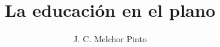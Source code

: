 \documentclass[12pt]{guia}
\title{La educaci\'on en el plano}
\author{J. C. Melchor Pinto}
\begin{document}
\pagestyle{headandfoot}
\addpoints
\INFO

\begin{questions}
    
\end{questions}
\end{document}
